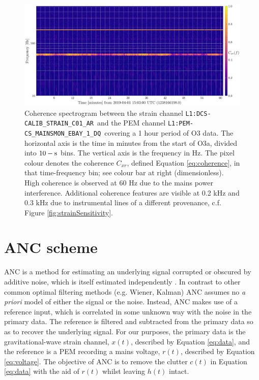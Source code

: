 \documentclass[pra,superscriptaddress,reprint,amsmath,amssymb,nofootinbib]{revtex4-2}
\newcommand{\StrainChanName}{\texttt{L1:DCS-CALIB\_STRAIN\_C01\_AR}}
\newcommand{\PEMChanName}{\texttt{L1:PEM-CS\_MAINSMON\_EBAY\_1\_DQ}}
\begin{document}
\begin{figure}
	\begin{center}
		\includegraphics[width=\textwidth]{images/coherence_spectrogram_canonical}
	\end{center}
	\caption{\label{correlation_1}
		Coherence spectrogram between the strain channel \StrainChanName  \, and the PEM channel \PEMChanName  	\, covering a 1 hour period of O3 data. The horizontal axis is the time in minutes from the start of O3a, divided into $10-{\rm s}$ bins. The vertical axis is the frequency in Hz. The pixel colour denotes the coherence $C_{xr}$, defined Equation \eqref{eq:coherence}, in that time-frequency bin; see colour bar at right (dimensionless). High coherence is observed at 60 Hz due to the mains power interference. Additional coherence features are visible at 0.2 kHz and 0.3 kHz due to instrumental lines of a different provenance, c.f. Figure \ref{fig:strainSensitivity}.}
\end{figure}



\section{ANC scheme}\label{sec:method}

ANC is a method for estimating an underlying signal corrupted or obscured by additive noise, which is itself estimated independently \cite{Widrow1451965}. In contrast to other common optimal filtering methods (e.g. Wiener, Kalman) ANC assumes no \textit{a priori} model of either the signal or the noise. Instead, ANC makes use of a reference input, which is correlated in some unknown way with the noise in the primary data. The reference is filtered and subtracted from the primary data so as to recover the underlying signal. For our purposes, the primary data is the gravitational-wave strain channel, $x(t)$, described by Equation \eqref{eq:data}, and the reference is a PEM recording a mains voltage, $r(t)$, described by Equation \eqref{eq:voltage}. The objective of ANC is to remove the clutter $c(t)$ in Equation \eqref{eq:data} with the aid of $r(t)$ whilst leaving $h(t)$ intact. \newline 
\end{document}
